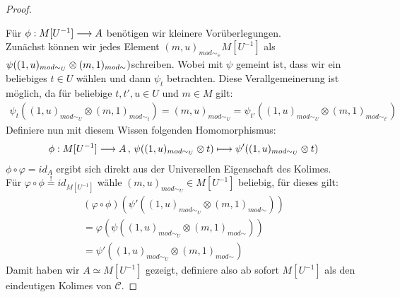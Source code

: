 \documentclass[10pt,a4paper]{report}
\newcommand{\functionfront}[3]{\nolinebreak{#1:#2 \longrightarrow #3}}
\newcommand{\function}[5]{\nolinebreak{#1:#2 \longrightarrow #3 \, , \, #4 \longmapsto #5}}
\newcommand{\tensor}[3]{#1 \otimes #3}
\newcommand{\lok}[2]{#1 [#2^{-1}]}
\newcommand{\loke}[3]{(#1,#2)_{mod\sim_{#3}}}
\newcommand*{\defshow}{\stackrel{!}{=}}
\begin{document}
\begin{proof}
\begin{center}
\end{center}
Für $\functionfront{\phi}{\lok{M}{U}}{A}$ benötigen wir kleinere Vorüberlegungen.\\
Zunächst können wir jedes Element $\loke{m}{u} \in \lok{M}{U}$ als $\nolinebreak{\psi(\tensor{\loke{1}{u}{U}}{\lok{M}{t}}{\loke{m}{1}{}}})$schreiben.
Wobei mit $\psi$ gemeint ist, dass wir ein beliebiges $t \in U$ wählen und dann $\psi_t$ betrachten. Diese Verallgemeinerung ist möglich, da für beliebige $t,t',u \in U$ und $m \in M$ gilt:
\begin{gather*}
\psi_t({\tensor{\loke{1}{u}{U}}{\lok{M}{t}}{\loke{m}{1}{t}}}) =
\loke{m}{u}{U} = 
\psi_{t'}({\tensor{\loke{1}{u}{U}}{\lok{M}{t'}}{\loke{m}{1}{t'}}})
\end{gather*}
Definiere nun mit diesem Wissen folgenden Homomorphismus:
\begin{gather*}
\function{\phi}{\lok{M}{U}}{A}{\psi(\tensor{\loke{1}{u}{U}}{\lok{\loke{m}{1}{}}{M}}{t})}{\psi'(\tensor{\loke{1}{u}{U}}{\lok{\loke{m}{1}{}}{M}}{t})}
\end{gather*}
$\phi \circ \varphi = id_A$ ergibt sich direkt aus der Universellen Eigenschaft des Kolimes.\\
Für $\varphi \circ \phi \defshow id_{\lok{M}{U}}$ wähle $\loke{m}{u}{U} \in \lok{M}{U}$ beliebig, für dieses gilt:
\begin{gather*}
(\varphi \circ \phi) (\psi'(\tensor{\loke{1}{u}{U}}{\lok{M}{t}}{\loke{m}{1}{}})) \\
 =\varphi(\psi(\tensor{\loke{1}{u}{U}}{\lok{M}{t}}{\loke{m}{1}{}})) \\
  =\psi'(\tensor{\loke{1}{u}{U}}{\lok{M}{t}}{\loke{m}{1}{}})
\end{gather*}
Damit haben wir $A \simeq \lok{M}{U}$ gezeigt, definiere also ab sofort $\lok{M}{U}$ als den eindeutigen Kolimes von $\mathcal{C}$.
\end{proof}
\end{document}
